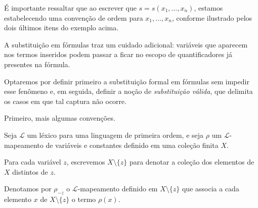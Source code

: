 É importante ressaltar que ao escrever que $s=s(x_1, \dots, x_n)$, estamos estabelecendo uma convenção de ordem para $x_1, \dots, x_n$, conforme ilustrado pelos dois últimos itens do exemplo acima.

A substituição em fórmulas traz um cuidado adicional: variáveis que aparecem nos termos inseridos podem passar a ficar no escopo de quantificadores já presentes na fórmula.

Optaremos por definir primeiro a substituição formal em fórmulas sem impedir esse fenômeno e, em seguida, definir a noção de \emph{substituição válida}, que delimita os casos em que tal captura não ocorre.

Primeiro, mais algumas convenções.
\begin{convention}\label{conv:substituicaoEmFormulas}
    Seja $\mathcal L$ um léxico para uma linguagem de primeira ordem, e seja $\rho$ um $\mathcal L$-mapeamento de variáveis e constantes definido em uma coleção finita $X$.

    Para cada variável $z$, escrevemos $X\setminus\{z\}$ para denotar a coleção dos elementos de $X$ distintos de $z$.

    Denotamos por $\rho_{-z}$ o $\mathcal L$-mapeamento definido em $X\setminus\{z\}$ que associa a cada elemento $x$ de $X\setminus\{z\}$ o termo $\rho(x)$.
\end{convention}


